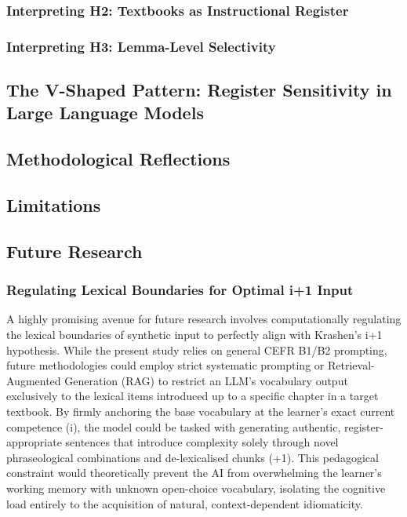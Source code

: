 \documentclass[11pt,a4paper]{article}
\begin{document}
\blindtext

\subsubsection{Interpreting H2: Textbooks as Instructional Register}\label{subsubsec:interpret-h2}

\blindtext

\subsubsection{Interpreting H3: Lemma-Level Selectivity}\label{subsubsec:interpret-h3}

\blindtext

\subsection{The V-Shaped Pattern: Register Sensitivity in Large Language Models}\label{subsec:v-shaped-pattern}

\blindtext

\subsection{Methodological Reflections}\label{subsec:methodological-reflections}

\blindtext

\subsection{Limitations}\label{subsec:limitations}

\blindtext

\subsection{Future Research}\label{subsec:future-research}

\subsubsection{Regulating Lexical Boundaries for Optimal i+1 Input}\label{subsubsec:lexical-boundaries}

A highly promising avenue for future research involves computationally regulating the lexical boundaries of synthetic input to perfectly align with Krashen's i+1 hypothesis. While the present study relies on general CEFR B1/B2 prompting, future methodologies could employ strict systematic prompting or Retrieval-Augmented Generation (RAG) to restrict an LLM's vocabulary output exclusively to the lexical items introduced up to a specific chapter in a target textbook. By firmly anchoring the base vocabulary at the learner's exact current competence (i), the model could be tasked with generating authentic, register-appropriate sentences that introduce complexity solely through novel phraseological combinations and de-lexicalised chunks (+1). This pedagogical constraint would theoretically prevent the AI from overwhelming the learner's working memory with unknown open-choice vocabulary, isolating the cognitive load entirely to the acquisition of natural, context-dependent idiomaticity.
\end{document}
